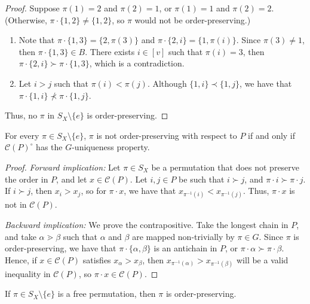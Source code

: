 \begin{proof}
Suppose $\pi(1) = 2$ and $\pi(2) = 1$, or $\pi(1) = 1$ and $\pi(2) = 2$. (Otherwise, $\pi \cdot \{1, 2\} \neq \{1, 2\}$, so $\pi$ would not be order-preserving.)

\begin{enumerate}
\item Note that $\pi \cdot \{1, 3\} = \{2, \pi(3)\}$ and $\pi \cdot \{2, i\} = \{1, \pi(i)\}$. Since $\pi(3) \neq 1$, then $\pi\cdot\{1, 3\} \in B$. There exists $i \in [v]$ such that $\pi(i) = 3$, then $\pi \cdot \{2, i\} \succ \pi \cdot \{1, 3\}$, which is a contradiction.
\item Let $i > j$ such that $\pi(i) < \pi(j)$. Although $\{1, i\} \prec \{1, j\}$, we have that $\pi \cdot \{1, i\} \not \prec \pi \cdot \{1, j\}$.
\end{enumerate}

Thus, no $\pi$ in $S_X\setminus\{e\}$ is order-preserving.
\end{proof}

\begin{prop}\label{noOrderPreservingIsGUniqueness}
For every $\pi \in S_X\setminus\{e\}$, $\pi$ is not order-preserving with respect to $P$ if and only if $\mathcal{C}(P)^\circ$ has the $G$-uniqueness property.
\end{prop}

\begin{proof}
\textit{Forward implication:} Let $\pi \in S_X$ be a permutation that does not preserve the order in $P$, and let $x\in\mathcal{C}(P)$. Let $i,j\in P$ be such that $i \succ j$, and $\pi\cdot i \succ \pi\cdot j$. If $i\succ j$, then $x_i > x_j$, so for $\pi\cdot x$, we have that $x_{\pi^{-1}(i)} < x_{\pi^{-1}(j)}$. Thus, $\pi\cdot x$ is not in $\mathcal{C}(P)$.


\textit{Backward implication:} We prove the contrapositive. Take the longest chain in $P$, and take $\alpha \gtrdot \beta$ such that $\alpha$ and $\beta$ are mapped non-trivially by $\pi \in G$. Since $\pi$ is order-preserving, we have that $\pi\cdot\{\alpha, \beta\}$ is an antichain in $P$, or $\pi\cdot\alpha \succ \pi\cdot\beta$. Hence, if $x \in \mathcal{C}(P)$ satisfies $x_\alpha > x_\beta$, then $x_{\pi^{-1}(\alpha)} > x_{\pi^{-1}(\beta)}$ will be a valid inequality in $\mathcal{C}(P)$, so $\pi\cdot x\in\mathcal{C}(P)$.
\end{proof}


\iffalse
\begin{prop}
If $\pi \in S_X\setminus\{e\}$ is a free permutation, then $\pi$ is order-preserving.
\end{prop}

